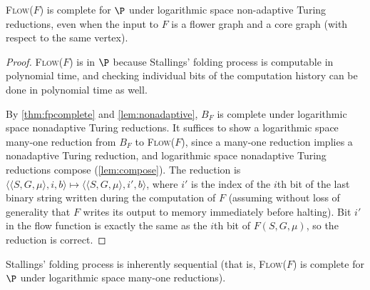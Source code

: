 \documentclass{article}
\newcommand{\Flow}{\textsc{Flow($F$)}}
\begin{document}
\begin{theorem}
  \Flow{} is complete for $\P$ under logarithmic space non-adaptive Turing reductions, even when the input to $F$ is a flower graph and a core graph (with respect to the same vertex).
\end{theorem}
\begin{proof}
  \Flow{} is in $\P$ because Stallings' folding process is computable in polynomial time, and checking individual bits of the computation history can be done in polynomial time as well.

  By \autoref{thm:fpcomplete} and \autoref{lem:nonadaptive}, $B_F$ is complete under logarithmic space nonadaptive Turing reductions.
  It suffices to show a logarithmic space many-one reduction from $B_F$ to \Flow{}, since a many-one reduction implies a nonadaptive Turing reduction, and logarithmic space nonadaptive Turing reductions compose (\autoref{lem:compose}).
  The reduction is $\langle \langle S, G, \mu \rangle, i, b \rangle \mapsto \langle \langle S, G, \mu \rangle, i', b\rangle$, where $i'$ is the index of the $i$th bit of the last binary string written during the computation of $F$ (assuming without loss of generality that $F$ writes its output to memory immediately before halting).
  Bit $i'$ in the flow function is exactly the same as the $i$th bit of $F(S, G, \mu)$, so the reduction is correct.
\end{proof}

\begin{conjecture}
  Stallings' folding process is inherently sequential (that is, \Flow{} is complete for $\P$ under logarithmic space many-one reductions).
\end{conjecture}

\printbibliography
\end{document}
